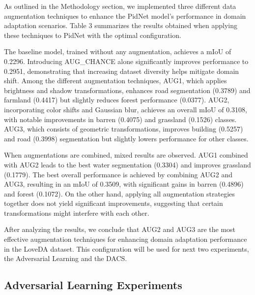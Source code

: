 \documentclass[10pt,twocolumn,letterpaper]{article}
\begin{document}
As outlined in the Methodology section, we implemented three different data augmentation techniques to enhance the PidNet model’s performance in domain adaptation scenarios. Table 3 summarizes the results obtained when applying these techniques to PidNet with the optimal configuration.

The baseline model, trained without any augmentation, achieves a mIoU of 0.2296. Introducing AUG\_CHANCE alone significantly improves performance to 0.2951, demonstrating that increasing dataset diversity helps mitigate domain shift. Among the different augmentation techniques, AUG1, which applies brightness and shadow transformations, enhances road segmentation (0.3789) and farmland (0.4417) but slightly reduces forest performance (0.0377). AUG2, incorporating color shifts and Gaussian blur, achieves an overall mIoU of 0.3108, with notable improvements in barren (0.4075) and grassland (0.1526) classes. AUG3, which consists of geometric transformations, improves building (0.5257) and road (0.3998) segmentation but slightly lowers performance for other classes. 

When augmentations are combined, mixed results are observed. AUG1 combined with AUG2 leads to the best water segmentation (0.3304) and improves grassland (0.1779). The best overall performance is achieved by combining AUG2 and AUG3, resulting in an mIoU of 0.3509, with significant gains in barren (0.4896) and forest (0.1072). On the other hand, applying all augmentation strategies together does not yield significant improvements, suggesting that certain transformations might interfere with each other. 

After analyzing the results, we conclude that AUG2 and AUG3 are the most effective augmentation techniques for enhancing domain adaptation performance in the LoveDA dataset. This configuration will be used for next two experiments, the Adversarial Learning and the DACS.

\subsection{Adversarial Learning Experiments}
\end{document}
